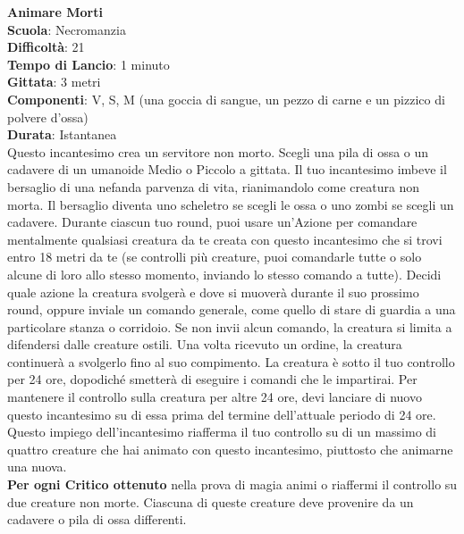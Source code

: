 \begin{multicols}{2}
\medskip\textbf{Animare Morti}\\
\textbf{Scuola}: Necromanzia\\
\textbf{Difficoltà}: 21\\
\textbf{Tempo di Lancio}: 1 minuto\\
\textbf{Gittata}: 3 metri\\
\textbf{Componenti}: V, S, M (una goccia di sangue, un pezzo di carne e un pizzico di polvere d'ossa)\\
\textbf{Durata}: Istantanea\\
Questo incantesimo crea un servitore non morto. Scegli una pila di ossa o un cadavere di un umanoide Medio o Piccolo a gittata. Il tuo incantesimo imbeve il bersaglio di una nefanda parvenza di vita, rianimandolo come creatura non morta. Il bersaglio diventa uno scheletro se scegli le ossa o uno zombi se scegli un cadavere. Durante ciascun tuo round, puoi usare un'Azione per comandare mentalmente qualsiasi creatura da te creata con questo incantesimo che si trovi entro 18 metri da te (se controlli più creature, puoi comandarle tutte o solo alcune di loro allo stesso momento, inviando lo stesso comando a tutte). Decidi quale azione la creatura svolgerà e dove si muoverà durante il suo prossimo round, oppure inviale un comando generale, come quello di stare di guardia a una particolare stanza o corridoio. Se non invii alcun comando, la creatura si limita a difendersi dalle creature ostili. Una volta ricevuto un ordine, la creatura continuerà a svolgerlo fino al suo compimento. La creatura è sotto il tuo controllo per 24 ore, dopodiché smetterà di eseguire i comandi che le impartirai. Per mantenere il controllo sulla creatura per altre 24 ore, devi lanciare di nuovo questo incantesimo su di essa prima del termine dell'attuale periodo di 24 ore. Questo impiego dell'incantesimo riafferma il tuo controllo su di un massimo di quattro creature che hai animato con questo incantesimo, piuttosto che animarne una nuova.\\
\textbf{Per ogni Critico ottenuto} nella prova di magia animi o riaffermi il controllo su due creature non morte. Ciascuna di queste creature deve provenire da un cadavere o pila di ossa differenti.


\end{multicols}
